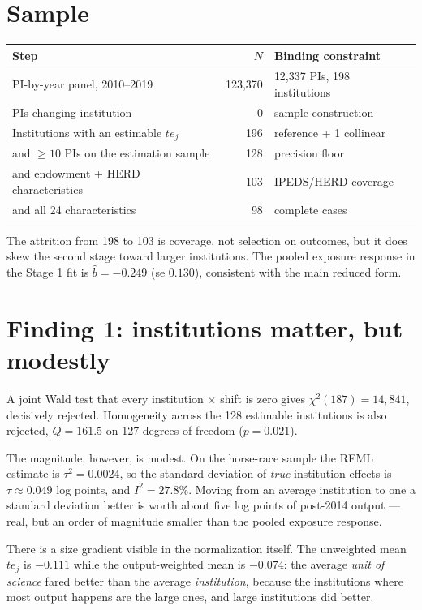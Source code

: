 \documentclass[11pt]{article}
\newcommand{\Post}{\mathrm{Post}}
\begin{document}
\section{Sample}

\begin{center}
\begin{tabular}{@{}lrl@{}}
\toprule
Step & $N$ & Binding constraint \\
\midrule
PI-by-year panel, 2010--2019 & 123,370 & 12,337 PIs, 198 institutions \\
PIs changing institution     & 0        & sample construction \\
Institutions with an estimable $te_j$ & 196 & reference + 1 collinear \\
\quad and $\ge 10$ PIs on the estimation sample & 128 & precision floor \\
\quad and endowment + HERD characteristics      & 103 & IPEDS/HERD coverage \\
\quad and all 24 characteristics                & 98  & complete cases \\
\bottomrule
\end{tabular}
\end{center}

\noindent
The attrition from 198 to 103 is coverage, not selection on outcomes, but it
does skew the second stage toward larger institutions. The pooled exposure
response in the Stage 1 fit is $\hat b = -0.249$ (se $0.130$), consistent
with the main reduced form.

\section{Finding 1: institutions matter, but modestly}

A joint Wald test that every institution $\times$ \Post{} shift is zero gives
$\chi^2(187) = 14{,}841$, decisively rejected. Homogeneity across the 128
estimable institutions is also rejected, $Q = 161.5$ on 127 degrees of
freedom ($p = 0.021$).

The magnitude, however, is modest. On the horse-race sample the REML estimate
is $\tau^2 = 0.0024$, so the standard deviation of \emph{true} institution
effects is $\tau \approx 0.049$ log points, and $I^2 = 27.8\%$. Moving from
an average institution to one a standard deviation better is worth about five
log points of post-2014 output --- real, but an order of magnitude smaller
than the pooled exposure response.

There is a size gradient visible in the normalization itself. The unweighted
mean $te_j$ is $-0.111$ while the output-weighted mean is $-0.074$: the
average \emph{unit of science} fared better than the average
\emph{institution}, because the institutions where most output happens are
the large ones, and large institutions did better.
\end{document}
